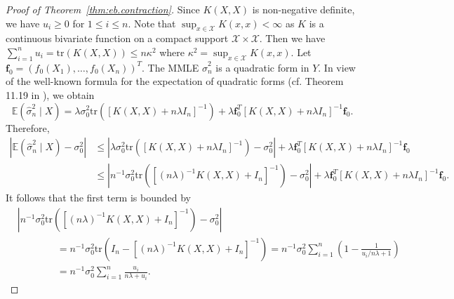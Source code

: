 \documentclass[12pt]{article}
\newcommand{\tr}{\mathrm{tr}}
\newcommand{\EE}{\mathbb{E}}
\newcommand{\mX}{\mathcal{X}}
\theoremstyle{plain}
\theoremstyle{nonitalicremark}
\begin{document}
\begin{appendices}
\begin{proof}[Proof of Theorem~\ref{thm:eb.contraction}]
Since $K(X,X)$ is non-negative definite, we have $u_i\geq 0$ for $1\leq i\leq n$. Note that $\sup_{x\in\mX}K(x,x)<\infty$ as $K$ is a continuous bivariate function on a compact support $\mX\times \mX$. Then we have $\sum_{i=1}^{n}u_i=\tr(K(X,X)) \leq n \kappa^2$ where $\kappa^2 = \sup_{x\in\mX}K(x,x)$. 
Let $\bm f_0=(f_0(X_1),\ldots,f_0(X_n))^T$. The MMLE $\hat{\sigma}_n^2$ is a quadratic form in $Y$. In view of the well-known formula for the expectation of quadratic forms (cf. Theorem 11.19 in \cite{schott2016matrix}), we obtain
\begin{equation}
\EE(\hat{\sigma}^2_n\mid X)=\lambda \sigma_0^2\tr([K(X,X)+n\lambda I_n]^{-1})+\lambda\bm f_0^T[K(X,X)+n\lambda I_n]^{-1}\bm f_0.
\end{equation}
Therefore,
\begin{align}
|\EE(\hat{\sigma}^2_n\mid X)-\sigma_0^2| &\leq \left|\lambda \sigma_0^2\tr([K(X,X)+n\lambda I_n]^{-1})-\sigma_0^2\right|+\lambda\bm f^T_0[K(X,X)+n\lambda I_n]^{-1}\bm f_0\\
\label{eq:mean.sigma} &\leq \left|n^{-1} \sigma_0^2\tr([(n\lambda)^{-1}K(X,X)+I_n]^{-1})-\sigma_0^2\right|+\lambda\bm f^T_0[K(X,X)+n\lambda I_n]^{-1}\bm f_0.
\end{align}
It follows that the first term is bounded by
\begin{equation}\label{eq:variance.1}
\begin{aligned}
&\left|n^{-1} \sigma_0^2\tr([(n\lambda)^{-1}K(X,X)+I_n]^{-1})-\sigma_0^2\right|\\
&\qquad\qquad= n^{-1}\sigma_0^2 \tr(I_n-[(n\lambda)^{-1}K(X,X)+I_n]^{-1})
=n^{-1}\sigma_0^2\sum_{i=1}^n\left(1-\frac{1}{u_i/n\lambda+1}\right)\\
&\qquad\qquad= n^{-1}\sigma_0^2\sum_{i=1}^{n}\frac{u_i}{n\lambda+u_i}.
\end{aligned}
\end{equation}


\end{proof}
\end{appendices}
\end{document}
